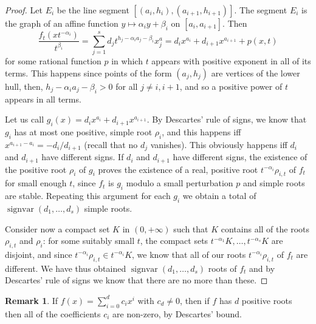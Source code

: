 \documentclass[11pt, a4paper]{article}
\DeclareMathOperator{\sv}{signvar}
\theoremstyle{plain}
\theoremstyle{definition}
\newtheorem{rem}[prop]{Remark}
\begin{document}
\begin{proof} Let $E_i$ be the line segment $[(a_i,h_i),(a_{i+1},h_{i+1})]$. The segment $E_i$ is the graph of an affine function $y\mapsto \alpha_i y+\beta_i$ on $[a_i,a_{i+1}]$. Then
\[\frac{f_t(xt^{-\alpha_i})}{t^{\beta_i}}= \sum_{j=1}^s d_j t^{h_j-\alpha_ia_j-\beta_i} x^a_j=d_ix^{a_i}+d_{i+1}x^{a_{i+1}}+p(x,t)\]
for some rational function $p$ in which $t$ appears with positive exponent in all of its terms. This happens since points of the form $(a_j,h_j)$ are vertices of the lower hull, then, $h_j-\alpha_i a_j-\beta_i > 0$ for all $j\neq i,i+1$, and so a positive power of $t$ appears in all terms.

Let us call $g_i(x) = d_ix^{a_i}+d_{i+1}x^{a_{i+1}}$. By Descartes' rule of signs, we know that $g_i$ has at most one positive, simple root $\rho_i$, and this happens iff $x^{a_{i+1}-a_i} = -d_i/d_{i+1}$ (recall that no $d_j$ vanishes). This obviously happens iff $d_i$ and $d_{i+1}$ have different signs.  If $d_i$ and $d_{i+1}$ have different signs, the existence of the positive root $\rho_i$ of $g_i$ proves the existence of a real, positive root $t^{-\alpha_i}\rho_{i,t}$ of $f_t$ for small enough $t$, since $f_t$ is $g_i$ modulo a small perturbation $p$ and simple roots are stable. Repeating this argument for each $g_i$ we obtain a total of $\sv(d_1,\dots,d_s)$ simple roots.

Consider now a compact set $K$ in $(0,+\infty)$ such that $K$ contains all of the roots $\rho_{i,t}$ and $\rho_i$: for some suitably small $t$, the compact sets $t^{-\alpha_1}K,\dots, t^{-\alpha_s}K$ are disjoint, and since $t^{-\alpha_i}\rho_{i,t}\in t^{-\alpha_i}K$, we know that all of our roots $t^{-\alpha_i}\rho_{i,t}$ of $f_t$ are different. We have thus obtained $\sv(d_1,\dots,d_s)$ roots of $f_t$ and by Descartes' rule of signs we know that there are no more than these.
\end{proof}

\begin{rem} If $f(x)=\sum_{i=0}^d c_ix^i$ with $c_d\neq 0$, then if $f$ has $d$ positive roots then all of the coefficients $c_i$ are non-zero, by Descartes' bound.
\end{rem}
\end{document}
